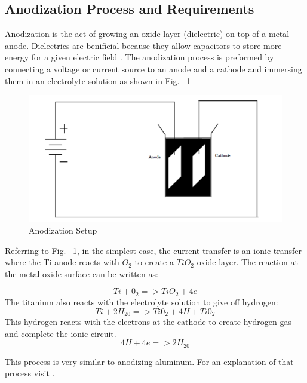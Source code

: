 \documentclass[journal]{IEEEtran}
\begin{document}
\subsection{Anodization Process and Requirements}

Anodization is the act of growing an oxide layer (dielectric) on top of a metal anode. Dielectrics are benificial because they allow capacitors to store more energy for a given electric field \cite{cwruEncDie}. The anodization process is preformed by connecting a voltage or current source to an anode and a cathode and immersing them in an electrolyte solution as shown in Fig. ~\ref{fig:anodSetup}

\begin{figure}[here]
\centering
\includegraphics{anodSetup}
\caption{Anodization Setup}
\label{fig:anodSetup}
\end{figure}


Referring to Fig. ~\ref{fig:anodSetup}, in the simplest case, the current transfer is an ionic transfer where the Ti anode reacts with $O_{2}$ to create a $TiO_{2}$ oxide layer. The reaction at the metal-oxide surface can be written as:

\begin{equation}
Ti + 0_2 => TiO_2 + 4e
\end{equation}
The titanium also reacts with the electrolyte solution to give off hydrogen:
\begin{equation}
Ti + 2H_20 => Ti0_2 + 4H+Ti0_2
\end{equation}
This hydrogen reacts with the electrons at the cathode to create hydrogen gas and complete the ionic circuit.
\begin{equation}
4H + 4e => 2H_20
\end{equation}

This process is very similar to anodizing aluminum. For an explanation of that process visit \cite{cwruEncAlanod}.
\end{document}
